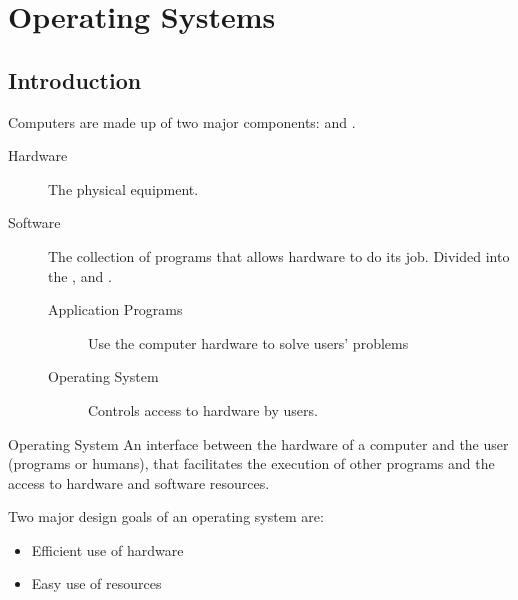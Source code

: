 \documentclass[\main/notes.tex]{subfiles}
\begin{document}
	\setcounter{chapter}{6}
	\chapter{Operating Systems}
		\section{Introduction}
			Computers are made up of two major components:  and .
			\begin{indentparagraph}
				\begin{description}
					\item[Hardware] The physical equipment.
					\item[Software] The collection of programs that allows hardware to do its job. Divided into the , and .
					\begin{indentparagraph}
						\begin{description}
							\item[Application Programs] Use the computer hardware to solve users' problems
							\item[Operating System] Controls access to hardware by users.
						\end{description}
					\end{indentparagraph}
				\end{description}
			\end{indentparagraph}
			\begin{definition}{Operating System}
				An interface between the hardware of a computer and the user (programs or humans), that facilitates the execution of other programs and the access to hardware and software resources.
			\end{definition}
			Two major design goals of an operating system are:
			\begin{indentparagraph}
				\begin{itemize}
					\item Efficient use of hardware
					\item Easy use of resources
				\end{itemize}
			\end{indentparagraph}
\end{document}
